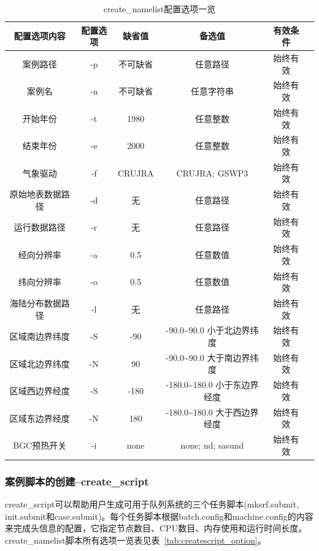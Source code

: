 \begin{table}[!htbp]
\renewcommand{\arraystretch}{1.5}
\centering
\caption{create\_namelist配置选项一览}\label{tab:createnml_option}
\begin{tabular}{
cccccc} \toprule
\textbf{配置选项内容} & \textbf{配置选项} & \textbf{缺省值} & \textbf{备选值} & \textbf{有效条件}\\ \midrule
案例路径 & -p & 不可缺省 & 任意路径 & 始终有效 \\
案例名  & -n & 不可缺省 & 任意字符串 & 始终有效 \\
开始年份 & -t & 1980 & 任意整数 & 始终有效\\
结束年份 & -e & 2000 & 任意整数 & 始终有效\\
气象驱动 & -f & CRUJRA & CRUJRA; GSWP3  & 始终有效\\
原始地表数据路径 & -d & 无 & 任意路径 & 始终有效\\
运行数据路径 & -r & 无 & 任意路径 & 始终有效\\
经向分辨率 & -a & 0.5 & 任意数值 & 始终有效\\
纬向分辨率 & -o & 0.5 & 任意数值 & 始终有效\\
海陆分布数据路径 & -l & 无 & 任意路径 & 始终有效\\
区域南边界纬度 & -S & -90 & -90.0\textasciitilde90.0 小于北边界纬度 & 始终有效\\
区域北边界纬度 & -N & 90 & -90.0\textasciitilde90.0 大于南边界纬度 & 始终有效\\
区域西边界经度 & -S & -180 & -180.0\textasciitilde180.0 小于东边界经度 & 始终有效\\
区域东边界经度 & -N & 180 & -180.0\textasciitilde180.0 大于西边界经度 & 始终有效\\
BGC预热开关 & -i &none & none; nd; sasund& 始终有效 \\
\bottomrule
\end{tabular}
\end{table}

\subsubsection{案例脚本的创建--create\_script}

create\_script可以帮助用户生成可用于队列系统的三个任务脚本(mksrf.submit, init.submit和case.submit)。每个任务脚本根据batch.config和machine.config的内容来完成头信息的配置，它指定节点数目、CPU数目、内存使用和运行时间长度。create\_namelist脚本所有选项一览表见表~\ref{tab:createscript_option}。


